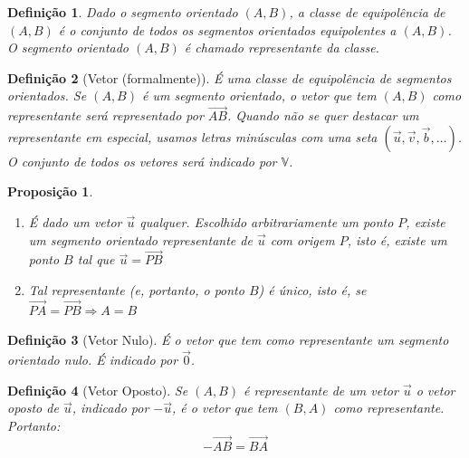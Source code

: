 \documentclass[oneside,a4paper,12pt]{article}
\newtheorem{proposition}{Proposição}[section]
\newtheorem{definition}{Definição}[section]
\begin{document}
\begin{definition}
	Dado o segmento orientado $(A,B)$, a \emph{classe de equipolência} de $(A,B)$ é o conjunto de todos os segmentos orientados equipolentes a $(A,B)$. O segmento orientado $(A,B)$ é chamado \emph{representante} da classe.
\end{definition}

\begin{definition}[Vetor (formalmente)]
	É uma classe de equipolência de segmentos orientados. Se $(A,B)$ é um segmento orientado, o vetor que tem $(A,B)$ como representante será representado por $\overrightarrow{AB}$. Quando não se quer destacar um representante em especial, usamos letras minúsculas com uma seta $(\overrightarrow{u}, \overrightarrow{v}, \overrightarrow{b}, \dots  )$. O conjunto de todos os vetores será indicado por $\mathbb{V}$. 
\end{definition}

\begin{proposition}
	\begin{enumerate}
		\item É dado um vetor $\overrightarrow{u}$ qualquer. Escolhido arbitrariamente um ponto $P$, existe um segmento orientado representante de $\overrightarrow{u}$ com origem $P$, isto é, existe um ponto $B$ tal que $\overrightarrow{u} = \overrightarrow{PB}$
		\item Tal representante (e, portanto, o ponto $B$) é único, isto é, se $\overrightarrow{PA} = \overrightarrow{PB} \Rightarrow A = B$
	\end{enumerate}
\end{proposition}

\begin{definition}[Vetor Nulo]
	É o vetor que tem como representante um segmento orientado nulo. É indicado por $\overrightarrow{0}$.
\end{definition}

\begin{definition}[Vetor Oposto]
	Se $(A,B)$ é representante de um vetor $\overrightarrow{u}$ o \emph{vetor oposto} de $\overrightarrow{u}$, indicado por $- \overrightarrow{u}$, é o vetor que tem $(B,A)$ como representante. Portanto: $$- \overrightarrow{AB} = \overrightarrow{BA}$$
\end{definition}
\end{document}
